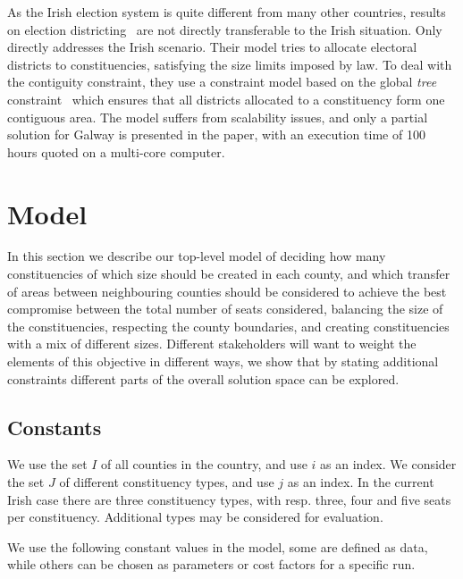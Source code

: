 \documentclass[runningheads]{llncs}
\begin{document}
As the Irish election system is quite different from many other countries, results on election districting~\cite{Almeida2022} are not directly transferable to the Irish situation. Only~\cite{Kotthoff2015} directly addresses the Irish scenario. Their model tries to allocate electoral districts to constituencies, satisfying the size limits imposed by law. To deal with the contiguity constraint, they use a constraint model based on the global \emph{tree} constraint~\cite{Beldiceanu2005} which ensures that all districts allocated to a constituency form one contiguous area. The model suffers from scalability issues, and only a partial solution for Galway is presented in the paper, with an execution time of 100 hours quoted on a multi-core computer. 



\section{Model}
\label{sec:model}

In this section we describe our top-level model of deciding how many constituencies of which size should be created in each county, and which transfer of areas between neighbouring counties should be considered to achieve the best compromise between the total number of seats considered, balancing the size of the constituencies, respecting the county boundaries, and creating constituencies with a mix of different sizes. Different stakeholders will want to weight the elements of this objective in different ways, we show that by stating additional constraints different parts of the overall solution space can be explored.

\subsection{Constants}

We use the set $I$ of all counties in the country, and use $i$ as an index. We consider the set $J$ of different constituency types, and use $j$ as an index. In the current Irish case there are three constituency types, with resp. three, four and five seats per constituency. Additional types may be considered for evaluation.

We use the following constant values in the model, some are defined as data, while others can be chosen as parameters or cost factors for a specific run. 
\end{document}
